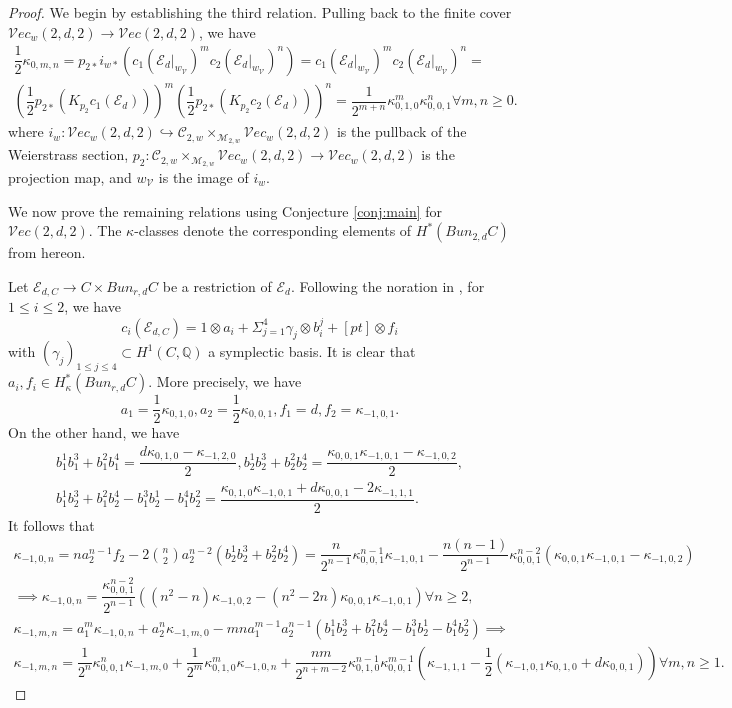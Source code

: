 \documentclass[11pt]{amsart}
\numberwithin{theorem}{section}
\numberwithin{lemma}{section}
\theoremstyle{definition}
\newcommand{\ri}{\rightarrow}
\newcommand{\ve}{\mathcal{V}ec}
\newcommand{\V}{\mathcal{V}}
\newcommand{\e}{\mathcal{E}}
\newcommand{\Q}{\mathbb{Q}}
\newcommand{\mC}{\mathcal{C}}
\newcommand{\ka}{\kappa}
\newcommand{\hr}{\hookrightarrow}
\begin{document}
\begin{proof}
We begin by establishing the third relation. Pulling back to the finite cover $\ve_w(2,d,2)\ri \ve(2,d,2)$, we have
\begin{gather*}\dfrac{1}{2}\ka_{0,m,n} = p_{2*}i_{w*}(c_1(\e_d|_{w_\V})^mc_2(\e_d|_{w_\V})^n) = c_1(\e_d|_{w_\V})^mc_2(\e_d|_{w_\V})^n = \\
\left(\dfrac{1}{2}p_{2*}(K_{p_2}c_1(\e_d))\right)^m\left(\dfrac{1}{2}p_{2*}(K_{p_2}c_2(\e_d))\right)^n= \dfrac{1}{2^{m+n}}\ka_{0,1,0}^m\ka_{0,0,1}^n\forall m,n\geq 0.\end{gather*}
where $i_w: \ve_w(2,d,2)\hr \mC_{2,w}\times_{\mathcal{M}_{2,w}}\ve_w(2,d,2)$ is the pullback of the Weierstrass section, $p_2:\mC_{2,w}\times_{\mathcal{M}_{2,w}}\ve_w(2,d,2)\ri\ve_w(2,d,2)$ is the projection map, and $w_\V$ is the image of $i_w$.

We now prove the remaining relations using Conjecture \ref{conj:main} for $\ve(2,d,2)$. The $\ka$-classes denote the corresponding elements of $H^*(Bun_{2,d}C)$ from hereon.

Let $\e_{d,C}\ri C\times Bun_{r,d}C$ be a restriction of $\e_d$. Following the noration in \cite[Theorem 4.7]{heinloth}, for $1\leq i\leq 2$, we have
$$c_i(\e_{d,C}) = 1\otimes a_i+\Sigma_{j=1}^4\gamma_j\otimes b_i^j+[pt]\otimes f_i$$
with $(\gamma_j)_{1\leq j\leq 4}\subset H^1(C,\Q)$ a symplectic basis.
It is clear that $a_i,f_i\in H^*_\ka(Bun_{r,d}C)$. More precisely, we have 
$$a_1 = \dfrac{1}{2}\ka_{0,1,0}, a_2 = \dfrac{1}{2}\ka_{0,0,1}, f_1 = d, f_2 = \ka_{-1,0,1}.$$
On the other hand, we have 
\begin{gather*}
	b_1^1b_1^3+b_1^2b_1^4 = \dfrac{d\ka_{0,1,0}-\ka_{-1,2,0}}{2},
	b_2^1b_2^3+b_2^2b_2^4 = \dfrac{\ka_{0,0,1}\ka_{-1,0,1}-\ka_{-1,0,2}}{2} ,\\
	b_1^1b_2^3+b_1^2b_2^4-b_1^3b_2^1-b_1^4b_2^2 = \dfrac{\ka_{0,1,0}\ka_{-1,0,1}+d\ka_{0,0,1}-2\ka_{-1,1,1}}{2}.
\end{gather*}
It follows that 
\begin{gather*}\ka_{-1,0,n} = na_2^{n-1}f_2-2{n\choose 2}a_2^{n-2}(b_2^1b_2^3+b_2^2b_2^4) = \dfrac{n}{2^{n-1}}\ka_{0,0,1}^{n-1}\ka_{-1,0,1}-\dfrac{n(n-1)}{2^{n-1}}\ka_{0,0,1}^{n-2}(\ka_{0,0,1}\ka_{-1,0,1}-\ka_{-1,0,2})\\
\implies \ka_{-1,0,n} = \dfrac{\ka_{0,0,1}^{n-2}}{2^{n-1}}((n^2-n)\ka_{-1,0,2}-(n^2-2n)\ka_{0,0,1}\ka_{-1,0,1})\forall n\geq 2,\\
\ka_{-1,m,n} = a_1^m\ka_{-1,0,n}+a_2^n\ka_{-1,m,0} - mna_1^{m-1}a_2^{n-1}(b_1^1b_2^3+b_1^2b_2^4 -b_1^3b_2^1 - b_1^4b_2^2)\implies \\
 \ka_{-1,m,n}=\dfrac{1}{2^n}\ka_{0,0,1}^n\ka_{-1,m,0}+\dfrac{1}{2^m}\ka_{0,1,0}^m\ka_{-1,0,n}+\dfrac{nm}{2^{n+m-2}}\ka_{0,1,0}^{n-1}\ka_{0,0,1}^{m-1}(\ka_{-1,1,1}-\dfrac{1}{2}(\ka_{-1,0,1}\ka_{0,1,0}+d\ka_{0,0,1}))\forall m,n\geq 1.
\end{gather*}
\end{proof}
\end{document}
